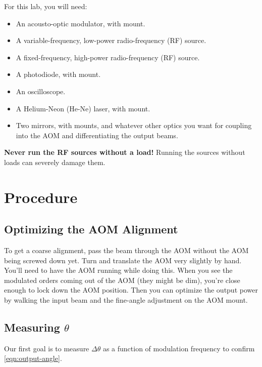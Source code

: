 \documentclass[]{manual}
\begin{document}
    For this lab, you will need:
    \begin{itemize}
        \item An acousto-optic modulator, with mount.
        \item A variable-frequency, low-power radio-frequency (RF) source.
        \item A fixed-frequency, high-power radio-frequency (RF) source.
        \item A photodiode, with mount.
        \item An oscilloscope.
        \item A Helium-Neon (He-Ne) laser, with mount.
        \item Two mirrors, with mounts, and whatever other optics you want for coupling into the AOM and differentiating the output beams.
    \end{itemize}

    \noindent
    \textbf{Never run the RF sources without a load!} Running the sources without loads can severely damage them.

    \FloatBarrier
    \newpage

    \section*{Procedure}
    
    \subsection{Optimizing the AOM Alignment}
    
    To get a coarse alignment, pass the beam through the AOM without the AOM being screwed down yet.
    Turn and translate the AOM very slightly by hand.
    You'll need to have the AOM running while doing this.
    When you see the modulated orders coming out of the AOM (they might be dim), you're close enough to lock down the AOM position.
    Then you can optimize the output power by walking the input beam and the fine-angle adjustment on the AOM mount.

    

    \subsection{Measuring $\theta$}

    Our first goal is to measure $\Delta \theta$ as a function of modulation frequency to confirm \eqref{eqn:output-angle}.
    
\end{document}
